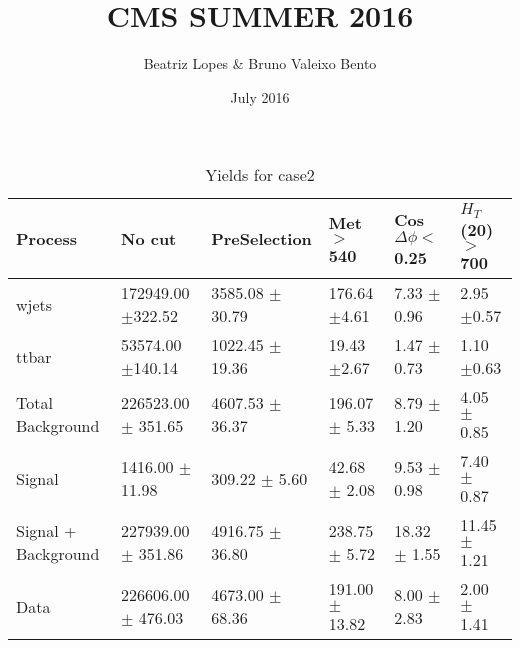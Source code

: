 \documentclass{article}
\title{CMS SUMMER 2016}
\author{Beatriz Lopes &  Bruno Valeixo Bento}
\date{July 2016}
\begin{document}
\maketitle
\begin{table}[!h]
\begin{tabular}{llllll}
\hline
Process & No cut& PreSelection& Met $>$ 540& Cos$\Delta \phi <$ 0.25& $H_T$ (20) $>$ 700\\
\hline
wjets & 172949.00 $\pm$322.52 & 3585.08 $\pm$30.79 & 176.64 $\pm$4.61 & 7.33 $\pm$0.96 & 2.95 $\pm$0.57 \\
ttbar & 53574.00 $\pm$140.14 & 1022.45 $\pm$19.36 & 19.43 $\pm$2.67 & 1.47 $\pm$0.73 & 1.10 $\pm$0.63 \\
Total Background & 226523.00 $\pm$ 351.65 & 4607.53 $\pm$ 36.37 & 196.07 $\pm$ 5.33 & 8.79 $\pm$ 1.20 & 4.05 $\pm$ 0.85 \\
\hline
Signal & 1416.00 $\pm$ 11.98 & 309.22 $\pm$ 5.60 & 42.68 $\pm$ 2.08 & 9.53 $\pm$ 0.98 & 7.40 $\pm$ 0.87 \\
\hline
Signal + Background & 227939.00 $\pm$ 351.86 & 4916.75 $\pm$ 36.80 & 238.75 $\pm$ 5.72 & 18.32 $\pm$ 1.55 & 11.45 $\pm$ 1.21 \\
\hline
\hline
Data & 226606.00 $\pm$ 476.03 & 4673.00 $\pm$ 68.36 & 191.00 $\pm$ 13.82 & 8.00 $\pm$ 2.83 & 2.00 $\pm$ 1.41 \\
\hline
\end{tabular}
\caption{Yields for case2}
\end{table}
\end{document}

